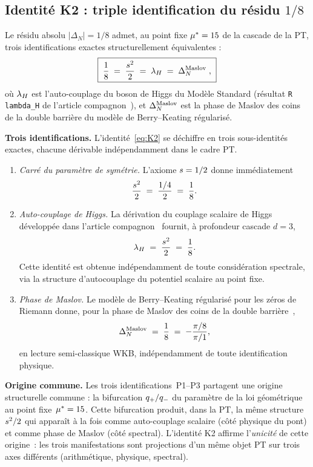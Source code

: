 \subsection{Identité K2 : triple identification du résidu \texorpdfstring{$1/8$}{1/8}}
\label{sec:spectrales:K2}

\begin{theoreme}
\label{thm:K2}
Le résidu absolu $|\Delta_N| = 1/8$ admet, au point fixe $\mu^{*} = 15$ de la cascade de la PT, trois identifications exactes structurellement équivalentes :
\begin{equation}
\boxed{\;
\dfrac{1}{8} \;=\; \dfrac{s^{2}}{2} \;=\; \lambda_H \;=\; \Delta_N^{\rm Maslov} \;,
\;}
\label{eq:K2}
\end{equation}
où $\lambda_H$ est l'auto-couplage du boson de Higgs du Modèle Standard (résultat \texttt{R\,lambda\_H} de l'article compagnon~\cite{companion_M5}), et $\Delta_N^{\rm Maslov}$ est la phase de Maslov des coins de la double barrière du modèle de Berry--Keating régularisé.
\end{theoreme}

\textbf{Trois identifications.} L'identité~\eqref{eq:K2} se déchiffre en trois sous-identités exactes, chacune dérivable indépendamment dans le cadre PT.
\begin{enumerate}[nosep,leftmargin=*,label=\textbf{P\arabic*.}]
\item \emph{Carré du paramètre de symétrie.} L'axiome $s = 1/2$ donne immédiatement
\[
\dfrac{s^{2}}{2} \;=\; \dfrac{1/4}{2} \;=\; \dfrac{1}{8}.
\]
\item \emph{Auto-couplage de Higgs.} La dérivation du couplage scalaire de Higgs développée dans l'article compagnon~\cite{companion_M5} fournit, à profondeur cascade $d = 3$,
\[
\lambda_H \;=\; \dfrac{s^{2}}{2} \;=\; \dfrac{1}{8}.
\]
Cette identité est obtenue indépendamment de toute considération spectrale, via la structure d'autocouplage du potentiel scalaire au point fixe.
\item \emph{Phase de Maslov.} Le modèle de Berry--Keating régularisé pour les zéros de Riemann donne, pour la phase de Maslov des coins de la double barrière~\cite{BerryKeating1999},
\[
\Delta_N^{\rm Maslov} \;=\; \dfrac{1}{8} \;=\; -\dfrac{\pi/8}{\pi/1},
\]
en lecture semi-classique WKB, indépendamment de toute identification physique.
\end{enumerate}

\textbf{Origine commune.} Les trois identifications~P1--P3 partagent une origine structurelle commune : la bifurcation $q_{+} / q_{-}$ du paramètre de la loi géométrique au point fixe~$\mu^{*} = 15$. Cette bifurcation produit, dans la PT, la même structure $s^{2}/2$ qui apparaît à la fois comme auto-couplage scalaire (côté physique du pont) et comme phase de Maslov (côté spectral). L'identité K2 affirme l'\emph{unicité} de cette origine~: les trois manifestations sont projections d'un même objet PT sur trois axes différents (arithmétique, physique, spectral).

